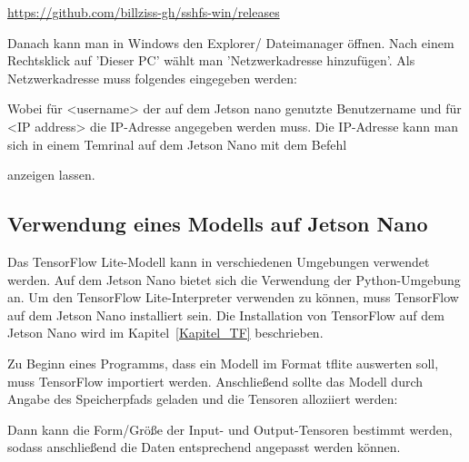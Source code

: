 \medskip

\url{https://github.com/billziss-gh/sshfs-win/releases}



\medskip

Danach kann man in Windows den Explorer/ Dateimanager öffnen. Nach einem Rechtsklick auf 'Dieser PC' wählt man 'Netzwerkadresse hinzufügen'. Als Netzwerkadresse muss folgendes eingegeben werden:

\medskip


\medskip

Wobei für <username> der auf dem Jetson nano genutzte Benutzername und für <IP address> die IP-Adresse angegeben werden muss. Die IP-Adresse kann man sich in einem Temrinal auf dem Jetson Nano mit dem Befehl

\medskip


\medskip

anzeigen lassen.




\subsection{Verwendung eines Modells auf Jetson Nano}

Das TensorFlow Lite-Modell kann in verschiedenen Umgebungen verwendet werden. Auf dem Jetson Nano bietet sich die Verwendung der Python-Umgebung an. Um den TensorFlow Lite-Interpreter verwenden zu können, muss TensorFlow auf dem Jetson Nano installiert sein. Die Installation von TensorFlow auf dem Jetson Nano wird im Kapitel~\ref{Kapitel_TF} beschrieben. 

Zu Beginn eines Programms, dass ein Modell im Format tflite auswerten soll, muss TensorFlow importiert werden. Anschließend sollte das Modell durch Angabe des Speicherpfads geladen und die Tensoren alloziiert werden:


\medskip




\medskip


Dann kann die Form/Größe der Input- und Output-Tensoren bestimmt werden, sodass anschließend die Daten entsprechend angepasst werden können.

